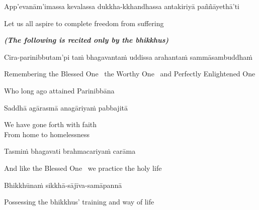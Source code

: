 \begin{pali-hang}
  App'evanām'imassa kevalassa dukkha-kkhandhassa antakiriyā paññāyethā'ti
\end{pali-hang}

\begin{english}
  Let us all aspire to complete freedom from suffering
\end{english}

\suttaRef{[SN 22.80]}

\clearpage

\begin{center}
  \textit{\textbf{(The following is recited only by the bhikkhus)}}
\end{center}

\begin{pali-hang}
  Cira-parinibbutam'pi taṁ bhagavantaṁ uddissa arahantaṁ sammāsambuddhaṁ
\end{pali-hang}

\begin{english-hang}
  Remembering the Blessed One \breathmark\ the Worthy One \breathmark\ and Perfectly Enlightened One\\
\end{english-hang}

\begin{english}
  Who long ago attained Parinibbāna
\end{english}

Saddhā agārasmā anagāriyaṁ pabbajitā

\begin{english}
  We have gone forth with faith\\
  From home to homelessness
\end{english}

Tasmiṁ bhagavati brahmacariyaṁ carāma

\begin{english}
  And like the Blessed One \breathmark\ we practice the holy life
\end{english}

Bhikkhūnaṁ sikkhā-sājīva-samāpannā

\begin{english}
  Possessing the bhikkhus' training and way of life\ifdigitalversion\makeatletter\hyperlink{endnote28-appendix}\makeatother\fi
\end{english}

